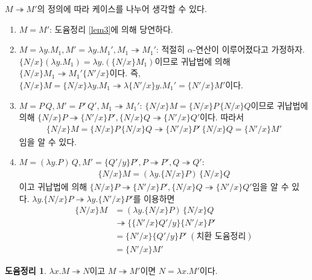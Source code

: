 \documentclass[b5paper, 10pt]{book}
\theoremstyle{definition}
\newtheorem{lem}[defn]{도윰정리}
\newenvironment{pf*}{\pushQED{\qed}\pf}{\popQED\endpf}
\begin{document}
\begin{pf*}
    $M \twoheadrightarrow M'$의 정의에 따라 케이스를 나누어 생각할 수 있다.
    \begin{enumerate}
        \item $M = M'$: 도윰정리 \ref{lem3}에 의해 당연하다.
        \item $M = \lambda y. M_1, M' = \lambda y. M_1', M_1 \twoheadrightarrow M_1'$:
        적절히 $\alpha$-연산이 이루어졌다고 가정하자. $ \{N / x\}(\lambda y. M_1) = 
        \lambda y. (\{N / x\} M_1)$이므로 귀납법에 의해 $\{ N / x \} M_1 \twoheadrightarrow M_1' \{N' / x\}$이다.
        즉, $\{N / x\} M = \{N / x \} \lambda y. M_1 \twoheadrightarrow \lambda 
        \{N' / x\} y. M_1' = \{N' / x\} M' $이다.
        \item $ M = P \, Q, M' = P' \, Q', M_1 \twoheadrightarrow M_1' $:
        $ \{N / x\}M = \{N / x \} P \, \{N / x\} Q$이므로 귀납법에 의해 $\{N / x\} P 
        \twoheadrightarrow \{N' / x \} P', \{N / x \} Q \twoheadrightarrow \{N' / x \} Q'$이다. 따라서 
        \begin{align*}
            \{N / x \} M = \{N / x \} P \, \{N / x\} Q
            \twoheadrightarrow \{N' / x \} P' \,  \{N / x \} Q
            = \{N' / x \} M'
        \end{align*} 임을 알 수 있다.
        \item $M = (\lambda y. P) \, Q, M' = \{Q' / y\} P' , P \twoheadrightarrow P' , Q \twoheadrightarrow Q'$:
        \begin{align*}
            \{N / x \} M = (\lambda y. \{N /x \} P) \, \{N /x \} Q 
        \end{align*}
        이고 귀납법에 의해 $ \{N / x\} P \twoheadrightarrow \{N' / x \} P', 
        \{N / x\} Q \twoheadrightarrow \{N' / x \} Q'$임을 알 수 있다. $\lambda y. \{N / x\} P 
        \twoheadrightarrow \lambda y. \{N' / x\} P' $를 이용하면
        \begin{align*}
            \{N / x\}M &= (\lambda y. \{N / x \} P )\, \{N / x\} Q \\ 
            &\twoheadrightarrow \{ \{N' / x\} Q' / y \} \{N' / x\} P' \\ 
            &= \{N' / x\}\{ Q' / y \} P' \; (\text{치환 도윰정리})\\ 
            &= \{N' / x\} M'
        \end{align*}
    \end{enumerate}
\end{pf*}
\begin{lem}
   $\lambda x. M \twoheadrightarrow N$이고 $M \twoheadrightarrow M'$이면
   $N = \lambda x.M'$이다.
\end{lem}
\end{document}

